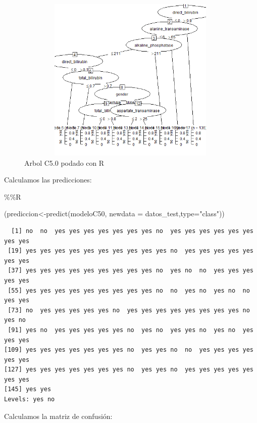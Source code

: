 \documentclass[
  11pt,
  a4paper,
]{article}
\newenvironment{Shaded}{\begin{snugshade}}{\end{snugshade}}
\newcommand{\AttributeTok}[1]{\textcolor[rgb]{0.77,0.63,0.00}{#1}}
\newcommand{\FunctionTok}[1]{\textcolor[rgb]{0.00,0.00,0.00}{#1}}
\newcommand{\NormalTok}[1]{#1}
\newcommand{\OtherTok}[1]{\textcolor[rgb]{0.56,0.35,0.01}{#1}}
\newcommand{\SpecialCharTok}[1]{\textcolor[rgb]{0.00,0.00,0.00}{#1}}
\newcommand{\StringTok}[1]{\textcolor[rgb]{0.31,0.60,0.02}{#1}}
\begin{document}
\begin{figure}
\centering
\includegraphics[width=4.375in,height=3.125in]{output_295_0.png}
\caption{Arbol C5.0 podado con R}
\end{figure}

\newpage

Calculamos las predicciones:

\begin{Shaded}
\begin{Highlighting}[]
\SpecialCharTok{\%\%}\NormalTok{R}

\NormalTok{(prediccion}\OtherTok{\textless{}{-}}\FunctionTok{predict}\NormalTok{(modeloC50, }\AttributeTok{newdata =}\NormalTok{ datos\_test,}\AttributeTok{type=}\StringTok{"class"}\NormalTok{))}
\end{Highlighting}
\end{Shaded}

\begin{verbatim}
  [1] no  no  yes yes yes yes yes yes yes no  yes yes yes yes yes yes yes yes
 [19] yes yes yes yes yes yes yes yes yes yes no  yes yes yes yes yes yes yes
 [37] yes yes yes yes yes yes yes yes yes no  yes no  no  yes yes yes yes yes
 [55] yes yes yes yes yes yes yes yes yes no  no  yes no  yes no  no  yes yes
 [73] no  yes yes yes yes yes no  yes yes yes yes yes yes yes yes no  yes no 
 [91] yes no  yes yes yes yes yes no  yes no  yes yes no  yes no  yes yes yes
[109] yes yes yes yes yes yes yes no  yes yes no  no  yes yes yes yes yes yes
[127] yes yes yes yes yes yes yes no  yes yes no  yes yes yes yes yes yes yes
[145] yes yes
Levels: yes no
\end{verbatim}

Calculamos la matriz de confusión:

\begin{Shaded}
\end{Shaded}
\end{document}
